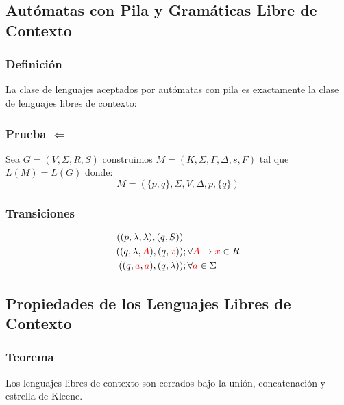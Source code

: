 \subsection{Autómatas con Pila y Gramáticas Libre de Contexto}
\subsubsection*{Definición}
La clase de lenguajes aceptados por autómatas con pila es exactamente la clase de lenguajes libres de contexto:
\subsubsection*{Prueba $\Leftarrow$}
Sea $G=(V,\Sigma,R,S)$ construimos $M=(K,\Sigma,\Gamma,\Delta,s,F)$ tal que $L(M)=L(G)$ donde:
$$
M = (\{p,q\},\Sigma,V,\Delta,p,\{ q\})
$$
\subsubsection*{Transiciones}
\begin{align}
((p,\lambda,\lambda),(q,S))&  \\
((q,\lambda,{\color{red}A}),(q,{\color{red}x}))&;\forall {\color{red}A}\rightarrow {\color{red}x} \in R \\
((q,{\color{red}a},{\color{red}a}),(q,\lambda))&;\forall {\color{red}a} \in \Sigma
\end{align}
\subsection{Propiedades de los Lenguajes Libres de Contexto}
\subsubsection*{Teorema}
Los lenguajes libres de contexto son cerrados bajo la unión, concatenación y estrella de Kleene.
